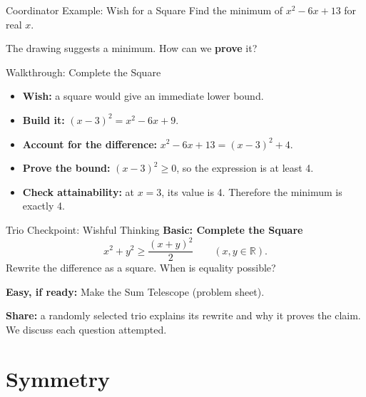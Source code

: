 \documentclass{beamer}
\begin{document}
\begin{frame}{Coordinator Example: Wish for a Square}
    Find the minimum of $x^2-6x+13$ for real $x$.

    \begin{center}
    \end{center}
    The drawing suggests a minimum. How can we \textbf{prove} it?
\end{frame}

\begin{frame}{Walkthrough: Complete the Square}
    \begin{itemize}
        \item \textbf{Wish:} a square would give an immediate lower bound.
        \item \textbf{Build it:} $(x-3)^2=x^2-6x+9$.
        \item \textbf{Account for the difference:}
            $x^2-6x+13=(x-3)^2+4$.
        \item \textbf{Prove the bound:} $(x-3)^2\ge0$, so the expression
            is at least 4.
        \item \textbf{Check attainability:} at $x=3$, its value is 4.
            Therefore the minimum is exactly 4.
    \end{itemize}
\end{frame}

\begin{frame}{Trio Checkpoint: Wishful Thinking}
    \textbf{Basic: Complete the Square}
    \[
        x^2+y^2\ge\frac{(x+y)^2}{2}\qquad(x,y\in\mathbb R).
    \]
    Rewrite the difference as a square. When is equality possible?

    \textbf{Easy, if ready:} Make the Sum Telescope (problem sheet).

    \textbf{Share:} a randomly selected trio explains its rewrite and
    why it proves the claim. We discuss each question attempted.
\end{frame}

\section{Symmetry}
\end{document}
